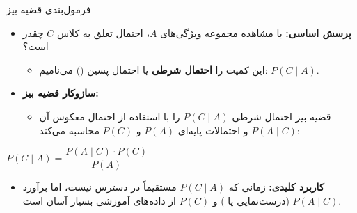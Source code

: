 \begin{frame}{فرمول‌بندی قضیه بیز}{}
  \begin{itemize}
    \setlength{\itemsep}{8pt}
    \item \textbf{پرسش اساسی:} با مشاهده مجموعه ویژگی‌های $A$، احتمال تعلق به کلاس $C$ چقدر است؟
    \begin{itemize}
      \item این کمیت را \textbf{احتمال شرطی} یا احتمال پسین () می‌نامیم: $P(C \mid A)$.
    \end{itemize}
    \item \textbf{سازوکار قضیه بیز:}
    \begin{itemize}
      \item قضیه بیز احتمال شرطی $P(C \mid A)$ را با استفاده از احتمال معکوس آن $P(A \mid C)$ و احتمالات پایه‌ای $P(A)$ و $P(C)$ محاسبه می‌کند:
    \end{itemize}
  \end{itemize}
  \vspace{0.2cm}
  \begin{center}
    \colorbox{codebg}{%
      \fontsize{13}{16}\selectfont
      $P(C \mid A) = \dfrac{P(A \mid C) \cdot P(C)}{P(A)}$
    }
  \end{center}
  \vspace{0.2cm}
  \begin{itemize}
    \item \textbf{کاربرد کلیدی:} زمانی که $P(C \mid A)$ مستقیماً در دسترس نیست، اما برآورد $P(A \mid C)$ (درست‌نمایی یا ) و $P(C)$ از داده‌های آموزشی بسیار آسان است.
  \end{itemize}
\end{frame}

